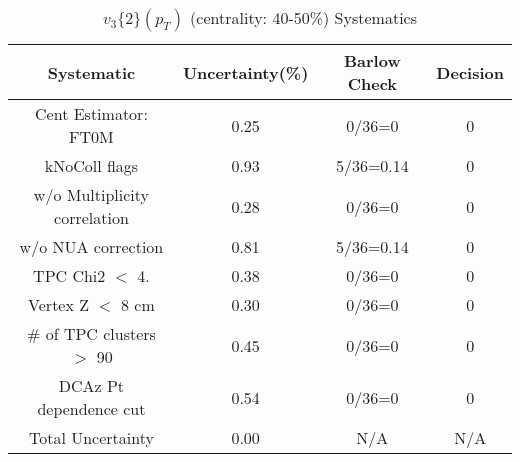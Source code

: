 \begin{table}[htbp]
\caption{$v_3\{2\}(p_{T})$ (centrality: 40-50\%) Systematics}
\label{tab:Sys_pTDiffv3}
\centering
\begin{tabular}{|c|c|c|c|}
\hline
Systematic & Uncertainty(\%) & Barlow Check & Decision \\
\hline
Cent Estimator: FT0M & 0.25 & 0/36=0 & 0 \\
kNoColl flags & 0.93 & 5/36=0.14 & 0 \\
w/o Multiplicity correlation & 0.28 & 0/36=0 & 0 \\
w/o NUA correction & 0.81 & 5/36=0.14 & 0 \\
TPC Chi2 $<$ 4. & 0.38 & 0/36=0 & 0 \\
Vertex Z $<$ 8 cm & 0.30 & 0/36=0 & 0 \\
\# of TPC clusters $>$ 90 & 0.45 & 0/36=0 & 0 \\
DCAz Pt dependence cut & 0.54 & 0/36=0 & 0 \\
\hline
Total Uncertainty & 0.00 & N/A & N/A \\
\hline
\end{tabular}
\end{table}
